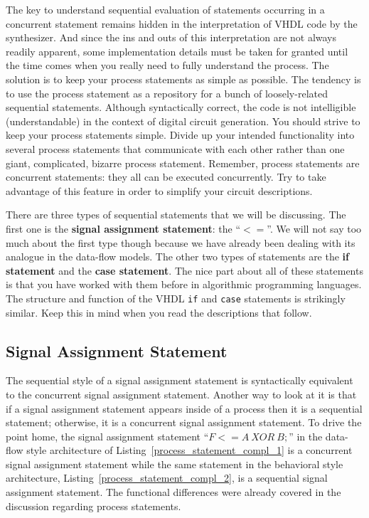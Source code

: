 The key to understand sequential evaluation of statements occurring in a concurrent statement remains hidden in the interpretation of VHDL code by the synthesizer. And since the ins and outs of this interpretation are not always readily apparent, some implementation details must be taken for granted until the time comes when you really need to fully understand the process. The solution is to keep your process statements as simple as possible. The tendency is to use the process statement as a repository for a bunch of loosely-related sequential statements. Although syntactically correct, the code is not intelligible (understandable) in the context of digital circuit generation. You should strive to keep your process statements simple. Divide up your intended functionality into several process statements that communicate with each other rather than one giant, complicated, bizarre process statement. Remember, process statements are concurrent statements: they all can be executed concurrently. Try to take advantage of this feature in order to simplify your circuit descriptions.

There are three types of sequential statements that we will be discussing. The first one is the \textbf{signal assignment statement}:
the ``{\footnotesize$<=$}''. We will not say too much about the first type though because we have already been dealing with its analogue in the data-flow models. The other two types of statements are the \textbf{if statement} and the \textbf{case statement}. The nice part about all of these statements is that you have worked with them before in algorithmic programming languages. The structure and function of the VHDL \texttt{if} and \texttt{case} statements is strikingly similar. Keep this in mind when you read the descriptions that follow.

\subsection{Signal Assignment Statement}
The sequential style of a signal assignment statement is syntactically equivalent to the concurrent signal assignment statement. Another way to look at it is that if a signal assignment statement appears inside of a process then it is a sequential statement; otherwise, it is a concurrent signal assignment statement. To drive the point home, the signal assignment statement ``{\footnotesize$F <= A~XOR~B;$}'' in the data-flow style architecture of Listing~\ref{process_statement_compl_1} is a concurrent signal assignment statement while the same statement in the behavioral style architecture, Listing~\ref{process_statement_compl_2}, is a sequential signal assignment statement. The functional differences were already covered in the discussion regarding process statements.

